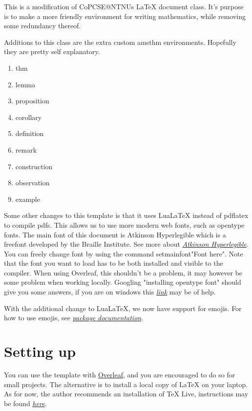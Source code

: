 \documentclass[../thesis.tex]{subfiles}
\begin{document}
This is a modification of CoPCSE@NTNUs LaTeX document class. It's purpose is to make a more friendly environment for writing mathematics, while removing some redundancy thereof.

Additions to this class are the extra custom amsthm environments. Hopefully they are pretty self explanatory.

\begin{enumerate}
    \item thm
    \item lemma
    \item proposition
    \item corollary
    \item definition
    \item remark
    \item construction
    \item observation
    \item example
\end{enumerate}

Some other changes to this template is that it uses LuaLaTeX instead of pdflatex to compile pdfs. This allows us to use more modern web fonts, such as opentype fonts. The main font of this document is Atkinson Hyperlegible which is a freefont developed by the Braille Institute. See more about \href{https://brailleinstitute.org/freefont}{\textit{Atkinson Hyperlegible}}. You can freely change font by using the command setmainfont{"Font here"}. Note that the font you want to load has to be both installed and visible to the compiler. When using Overleaf, this shouldn't be a problem, it may however be some problem when working locally. Googling "installing opentype font" should give you some answers, if you are on windows this \href{https://www.lifewire.com/installing-truetype-or-opentype-fonts-in-windows-1074134}{\textit{link}} may be of help.

With the additional change to LuaLaTeX, we now have support for emojis. For how to use emojis, see \href{https://texdoc.org/serve/emoji/0}{\textit{package documentation}}.

\section{Setting up}

You can use the template with \href{http://overleaf.com}{Overleaf}, and you are encouraged to do so for small projects. The alternative is to install a local copy of LaTeX on your laptop. As for now, the author recommends an installation of TeX Live, instructions may be found \href{https://www.tug.org/texlive/quickinstall.html}{\textit{here}}.
\end{document}
